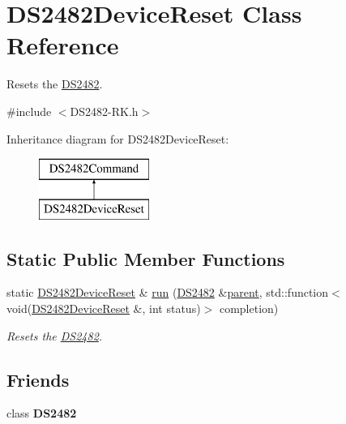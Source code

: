 \hypertarget{class_d_s2482_device_reset}{}\section{D\+S2482\+Device\+Reset Class Reference}
\label{class_d_s2482_device_reset}


Resets the \mbox{\hyperlink{class_d_s2482}{D\+S2482}}.  




{\ttfamily \#include $<$D\+S2482-\/\+R\+K.\+h$>$}

Inheritance diagram for D\+S2482\+Device\+Reset\+:\begin{figure}[H]
\begin{center}
\leavevmode
\includegraphics[height=2.000000cm]{class_d_s2482_device_reset}
\end{center}
\end{figure}
\subsection*{Static Public Member Functions}
\begin{DoxyCompactItemize}
\item 
static \mbox{\hyperlink{class_d_s2482_device_reset}{D\+S2482\+Device\+Reset}} \& \mbox{\hyperlink{class_d_s2482_device_reset_a4250bda2cf91a9c21c9ac4844e05689b}{run}} (\mbox{\hyperlink{class_d_s2482}{D\+S2482}} \&\mbox{\hyperlink{class_d_s2482_command_a54a41fb8a610ef2077f5e5377771aaf3}{parent}}, std\+::function$<$ void(\mbox{\hyperlink{class_d_s2482_device_reset}{D\+S2482\+Device\+Reset}} \&, int status)$>$ completion)
\begin{DoxyCompactList}\small\item\em Resets the \mbox{\hyperlink{class_d_s2482}{D\+S2482}}. \end{DoxyCompactList}\end{DoxyCompactItemize}
\subsection*{Friends}
\begin{DoxyCompactItemize}
\item 
\mbox{\label{class_d_s2482_device_reset_afeaf69274324e8dbeebede05c02d9c18}} 
class {\bfseries D\+S2482}
\end{DoxyCompactItemize}

